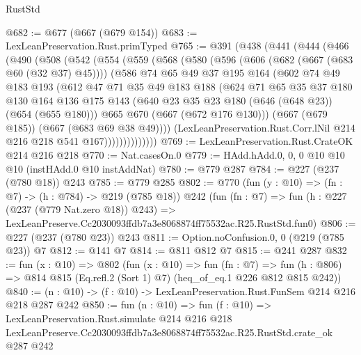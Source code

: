 \begin{lexlean}{RustStd}
\begin{coremodule}
@682 := @677 (@667 (@679 @154))
@683 := LexLeanPreservation.Rust.primTyped
@765 := @391
    (@438
      (@441
        (@444
          (@466
            (@490
              (@508
                (@542
                  (@554
                    (@559
                      (@568
                        (@580
                          (@596
                            (@606 (@682 (@667 (@683 @60 (@32 @37) @45))))
                            (@586
                              @74
                              @65
                              @49
                              @37
                              @195
                              @164
                              (@602
                                @74
                                @49
                                @183
                                @193
                                (@612
                                  @47
                                  @71
                                  @35
                                  @49
                                  @183
                                  @188
                                  (@624
                                    @71
                                    @65
                                    @35
                                    @37
                                    @180
                                    @130
                                    @164
                                    @136
                                    @175
                                    @143
                                    (@640 @23 @35 @23 @180 (@646 (@648 @23)) (@654 (@655 @180)))
                                    @665
                                    @670
                                    (@667 (@672 @176 @130)))
                                  (@667 (@679 @185))
                                  (@667 (@683 @69 @38 @49))))
                              (LexLeanPreservation.Rust.Corr.lNil
                                @214
                                @216
                                @218
                                @541
                                @167))))))))))))))
@769 := LexLeanPreservation.Rust.CrateOK @214 @216 @218
@770 := Nat.casesOn.{0}
@779 := HAdd.hAdd.{0, 0, 0} @10 @10 @10 (instHAdd.{0} @10 instAddNat)
@780 := @779 @287
@784 := @227 (@237 (@780 @18)) @243
@785 := @779 @285
@802 := @770
    (fun (y : @10) => (fn : @7) -> (h : @784) -> @219 (@785 @18))
    @242
    (fun (fn : @7) =>
    fun (h : @227 (@237 (@779 Nat.zero @18)) @243) =>
    LexLeanPreserve.Cc2030093ffdb7a3e8068874ff75532ac.R25.RustStd.fun0)
@806 := @227 (@237 (@780 @23)) @243
@811 := Option.noConfusion.{0, 0} (@219 (@785 @23)) @7
@812 := @141 @7
@814 := @811 @812 @7
@815 := @241 @287
@832 := fun (x : @10) =>
  @802
    (fun (x : @10) =>
    fun (fn : @7) =>
    fun (h : @806) => @814 @815 (Eq.refl.{2} (Sort 1) @7) (heq_of_eq.{1} @226 @812 @815 @242))
@840 := (n : @10) -> (f : @10) -> LexLeanPreservation.Rust.FunSem @214 @216 @218 @287 @242
@850 := fun (n : @10) =>
  fun (f : @10) =>
  LexLeanPreservation.Rust.simulate
    @214
    @216
    @218
    LexLeanPreserve.Cc2030093ffdb7a3e8068874ff75532ac.R25.RustStd.crate_ok
    @287
    @242
\end{coremodule}
\end{lexlean}
